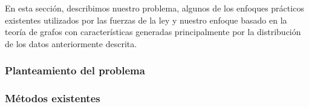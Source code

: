 En esta sección, describimos nuestro problema, algunos de los enfoques prácticos existentes utilizados por las fuerzas de la ley y nuestro enfoque basado en la teoría de grafos con características generadas principalmente por la distribución de los datos anteriormente descrita.

\subsubsection{Planteamiento del problema}


\subsubsection{Métodos existentes}
